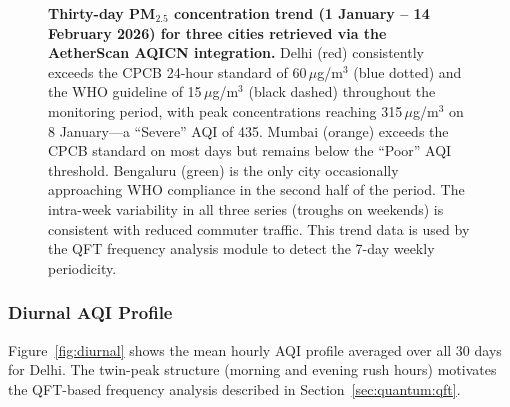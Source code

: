 \documentclass[12pt,a4paper]{article}
\begin{document}
\begin{figure}[H]
\caption[30-day PM\textsubscript{2.5} trend for Delhi, Mumbai, and Bengaluru]{%
  \textbf{Thirty-day PM$_{2.5}$ concentration trend (1 January -- 14 February
  2026) for three cities retrieved via the AetherScan AQICN integration.}
  Delhi (red) consistently exceeds the CPCB 24-hour standard of
  60\,$\mu$g/m$^3$ (blue dotted) and the WHO guideline of 15\,$\mu$g/m$^3$
  (black dashed) throughout the monitoring period, with peak concentrations
  reaching 315\,$\mu$g/m$^3$ on 8 January---a ``Severe'' AQI of 435.
  Mumbai (orange) exceeds the CPCB standard on most days but remains below
  the ``Poor'' AQI threshold. Bengaluru (green) is the only city
  occasionally approaching WHO compliance in the second half of the period.
  The intra-week variability in all three series (troughs on weekends)
  is consistent with reduced commuter traffic. This trend data is used by
  the QFT frequency analysis module to detect the 7-day weekly periodicity.}
\label{fig:pm25trend}
\end{figure}

\subsubsection{Diurnal AQI Profile}

Figure~\ref{fig:diurnal} shows the mean hourly AQI profile averaged over
all 30 days for Delhi. The twin-peak structure (morning and evening rush hours)
motivates the QFT-based frequency analysis described in Section~\ref{sec:quantum:qft}.
\end{document}
